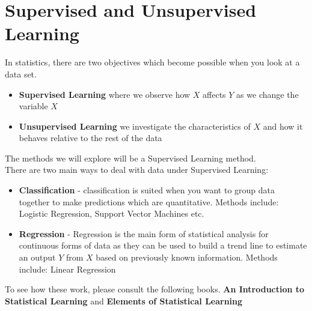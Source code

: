 \documentclass[11pt,a4paper]{report}
\begin{document}
\section{Supervised and Unsupervised Learning}
In statistics, there are two objectives which become possible when you look at a data set.

\begin{itemize}
  \item \textbf{Supervised Learning} where we observe how $X$ affects $Y$ as we change the variable $X$
  
  \item \textbf{Unsupervised Learning} we investigate the characteristics of $X$ and how it behaves relative to the rest of the data
\end{itemize}
The methods we will explore will be a Supervised Learning method.\\
There are two main ways to deal with data under Supervised Learning:
\begin{itemize}
    \item \textbf{Classification} - classification is suited when you want to group data together to make predictions which are quantitative. 
    Methods include: Logistic Regression, Support Vector Machines etc.
    
    \item \textbf{Regression} - Regression is the main form of statistical analysis for continuous forms of data as they can be used to build a trend line to estimate an output $Y$ from $X$ based on previously known information.
    Methods include: Linear Regression
\end{itemize}
To see how these work, please consult the following books.
\textbf{An Introduction to Statistical Learning} \cite[Chapter 3-4]{ISLR} 
and \textbf{Elements of Statistical Learning} \cite[Chapter 3-4]{ESL}
\end{document}
